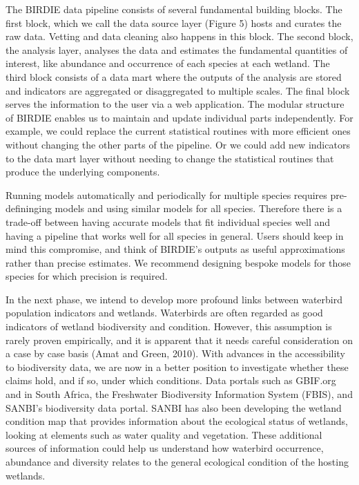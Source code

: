 \documentclass[utf8]{frontiersSCNS}
\begin{document}
The BIRDIE data pipeline consists of several fundamental building
blocks. The first block, which we call the data source layer (Figure 5)
hosts and curates the raw data. Vetting and data cleaning also happens
in this block. The second block, the analysis layer, analyses the data
and estimates the fundamental quantities of interest, like abundance and
occurrence of each species at each wetland. The third block consists of
a data mart where the outputs of the analysis are stored and indicators
are aggregated or disaggregated to multiple scales. The final block
serves the information to the user via a web application. The modular
structure of BIRDIE enables us to maintain and update individual parts
independently. For example, we could replace the current statistical
routines with more efficient ones without changing the other parts of
the pipeline. Or we could add new indicators to the data mart layer
without needing to change the statistical routines that produce the
underlying components.

Running models automatically and periodically for multiple species
requires pre-defininging models and using similar models for all
species. Therefore there is a trade-off between having accurate models
that fit individual species well and having a pipeline that works well
for all species in general. Users should keep in mind this compromise,
and think of BIRDIE's outputs as useful approximations rather than
precise estimates. We recommend designing bespoke models for those
species for which precision is required.

In the next phase, we intend to develop more profound links between
waterbird population indicators and wetlands. Waterbirds are often
regarded as good indicators of wetland biodiversity and condition.
However, this assumption is rarely proven empirically, and it is
apparent that it needs careful consideration on a case by case basis
(Amat and Green, 2010). With advances in the accessibility to
biodiversity data, we are now in a better position to investigate
whether these claims hold, and if so, under which conditions. Data
portals such as GBIF.org and in South Africa, the Freshwater
Biodiversity Information System (FBIS), and SANBI's biodiversity data
portal. SANBI has also been developing the wetland condition map that
provides information about the ecological status of wetlands, looking at
elements such as water quality and vegetation. These additional sources
of information could help us understand how waterbird occurrence,
abundance and diversity relates to the general ecological condition of
the hosting wetlands.
\end{document}
